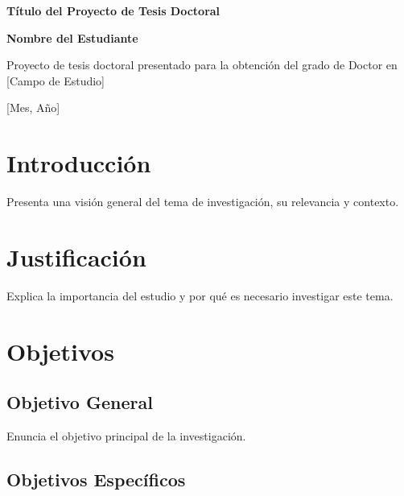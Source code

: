 \documentclass[12pt,a4paper]{article}
\begin{document}
\begin{center}
    \vspace*{2cm}
    
    {\LARGE \textbf{Título del Proyecto de Tesis Doctoral}}
    
    \vspace{1.5cm}
    
    \textbf{Nombre del Estudiante}
    
    \vspace{1cm}
    
    Proyecto de tesis doctoral presentado para la obtención del grado de Doctor en [Campo de Estudio]
    
    \vspace{2cm}
    
    [Mes, Año]
    
    \vspace{2cm}
\end{center}

\thispagestyle{fancy} %

\tableofcontents
\newpage

\section{Introducción}

Presenta una visión general del tema de investigación, su relevancia y contexto.

\section{Justificación}

Explica la importancia del estudio y por qué es necesario investigar este tema.

\section{Objetivos}

\subsection{Objetivo General}

Enuncia el objetivo principal de la investigación.

\subsection{Objetivos Específicos}
\end{document}
